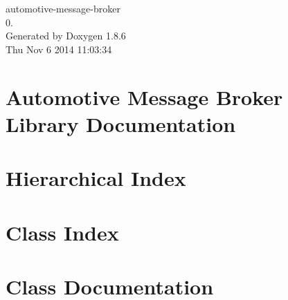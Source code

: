 \documentclass[twoside]{book}
\newcommand{\clearemptydoublepage}{%
  \newpage{\pagestyle{empty}\cleardoublepage}%
}
\begin{document}
\hypersetup{pageanchor=false}
\begin{titlepage}
\vspace*{7cm}
\begin{center}%
{\Large automotive-\/message-\/broker \\[1ex]\large 0. }\\
\vspace*{1cm}
{\large Generated by Doxygen 1.8.6}\\
\vspace*{0.5cm}
{\small Thu Nov 6 2014 11:03:34}\\
\end{center}
\end{titlepage}
\clearemptydoublepage
\tableofcontents
\clearemptydoublepage
{}
\hypersetup{pageanchor=true}

\chapter{Automotive Message Broker Library Documentation}
\label{index}\hypertarget{index}{}
\chapter{Hierarchical Index}

\chapter{Class Index}

\chapter{Class Documentation}










































\end{document}
